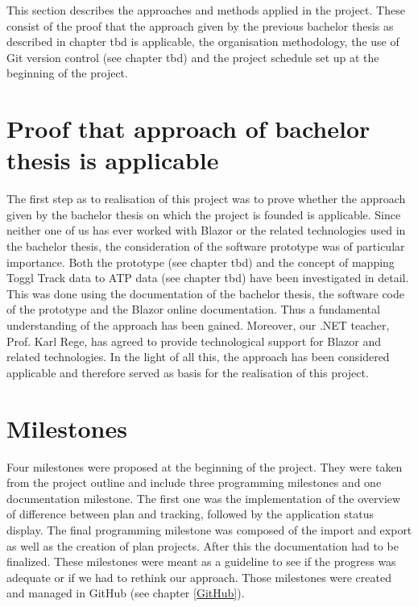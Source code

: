 
This section describes the approaches and methods applied in the project. These consist of the proof that the
approach given by the previous bachelor thesis as described in chapter tbd is applicable, the organisation methodology,
the use of Git version control (see chapter tbd) and the project schedule set up at the beginning of the project.

\section{Proof that approach of bachelor thesis is applicable}
The first step as to realisation of this project was to prove whether the approach given by the bachelor thesis
on which the project is founded is applicable. Since neither one of us has ever worked with Blazor or the 
related technologies used in the bachelor thesis, the consideration of the software prototype was of particular
importance. Both the prototype (see chapter tbd) and the concept of mapping Toggl Track data to ATP data (see
chapter tbd) have been investigated in detail. This was done using the documentation of the bachelor thesis,
the software code of the prototype and the Blazor online documentation. Thus a fundamental understanding of the
approach has been gained. Moreover, our .NET teacher, Prof. Karl Rege, has agreed to provide technological support 
for Blazor and related technologies. In the light of all this, the approach has been considered applicable and
therefore served as basis for the realisation of this project.

\section{Milestones} \label{Milestones}
Four milestones were proposed at the beginning of the project. They were taken from the project outline and include three programming milestones and one documentation milestone. The first one was the implementation of the overview of difference between plan and tracking, followed by the application status display. The final programming milestone was composed of the import and export as well as the creation of plan projects. After this the documentation had to be finalized. These milestones were meant as a guideline to see if the progress was adequate or if we had to rethink our approach. Those milestones were created and managed in GitHub (see chapter \ref{GitHub}). 

